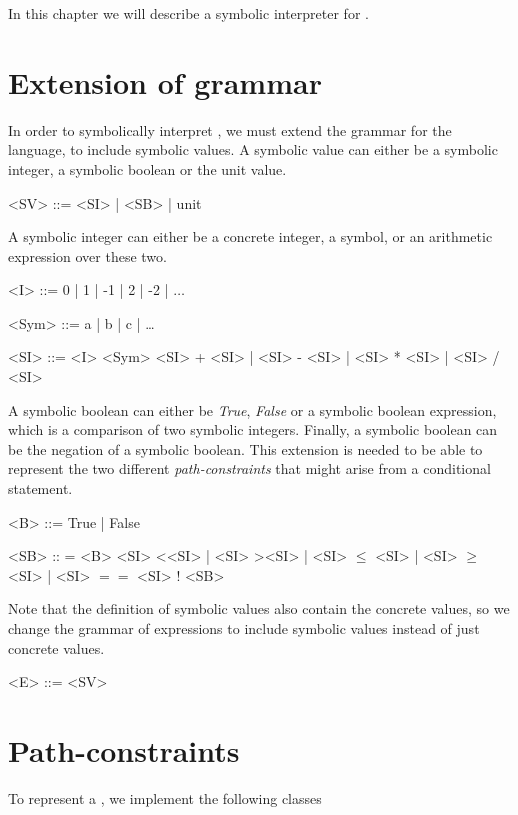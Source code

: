 In this chapter we will describe a symbolic interpreter for \explanguage. 

\section{Extension of grammar}

In order to symbolically interpret \explanguage, we must extend the grammar for the language, to include symbolic values. A symbolic value can either be a symbolic integer, a symbolic boolean or the unit value. 

\begin{grammar}
	<SV> ::= <SI> | <SB> | unit
\end{grammar}

A symbolic integer can either be a concrete integer, a symbol, or an arithmetic expression over these two.

\begin{grammar}
	<I> ::= 0 | 1 | -1 | 2 | -2 | $\ldots$
	
	<Sym> ::= a | b | c | \ldots
	
	<SI> ::= <I>
	\alt <Sym>	
	\alt <SI> + <SI> | <SI> - <SI> | <SI> * <SI> | <SI> / <SI>  
\end{grammar}

A symbolic boolean can either be \textsl{True}, \textsl{False} or a symbolic boolean expression, which is a comparison of two symbolic integers. Finally, a symbolic boolean can be the negation of a symbolic boolean. This extension is needed to be able to represent the two different \emph{path-constraints} that might arise from a conditional statement.

\begin{grammar}
	<B> ::= True | False 
	
	<SB> :: = <B>
	\alt <SI> \textless <SI> | <SI> \textgreater <SI> | <SI> $\leq$ <SI> | <SI> $\geq$ <SI> | <SI> $==$ <SI>
	\alt ! <SB>
\end{grammar} 

Note that the definition of symbolic values also contain the concrete values, so we change the grammar of expressions to include symbolic values instead of just concrete values.

\begin{grammar}
	<E> ::= <SV>
\end{grammar}

\section{Path-constraints}
To represent a \pc, we implement the following classes

